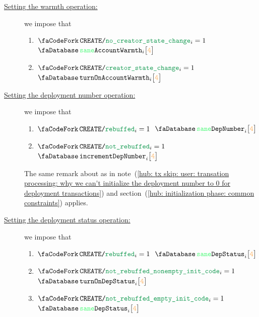 \begin{description}
\begin{enumerate}
		\end{enumerate}
	\item[\underline{Setting the warmth operation:}]
		we impose that
		\begin{enumerate}
			\item \If $\scenCreateNoCreatorStateChange _{i} = 1$ \Then $\accSameWarmth   {i}{\createFirstCreateeAccountRowOffset}$
			\item \If $\scenCreateCreatorStateChange   _{i} = 1$ \Then $\accTurnOnWarmth {i}{\createFirstCreateeAccountRowOffset}$
		\end{enumerate}
	\item[\underline{Setting the deployment number operation:}]
		we impose that
		\begin{enumerate}
			\item \If $\scenCreateRebuffed    _{i} = 1$ \Then $\accSameDeploymentNumber       {i}{\createFirstCreateeAccountRowOffset}$
			\item \If $\scenCreateNotRebuffed _{i} = 1$ \Then $\accIncrementDeploymentNumber  {i}{\createFirstCreateeAccountRowOffset}$
		\end{enumerate}
		\saNote{}
			The same remark about \accDeploymentNumber{} as in
			note~(\ref{hub: tx skip: user: transation processing: why we can't initialize the deployment number to 0 for deployment transactions}) and
			section~(\ref{hub: initialization phase: common constraints}) applies.
	\item[\underline{Setting the deployment status operation:}]
		we impose that
		\begin{enumerate}
			\item \If $\scenCreateRebuffed    _{i} = 1$ \Then $\accSameDeploymentStatus       {i}{\createFirstCreateeAccountRowOffset}$
			\item \If $\scenCreateExecutionNonEmptyInitCode _{i} = 1$ \Then $\accTurnOnDepStatus {i}{\createFirstCreateeAccountRowOffset}$
			\item \If $\scenCreateExecutionEmptyInitCode    _{i} = 1$ \Then $\accSameDeploymentStatus   {i}{\createFirstCreateeAccountRowOffset}$
		\end{enumerate}
\end{description}
